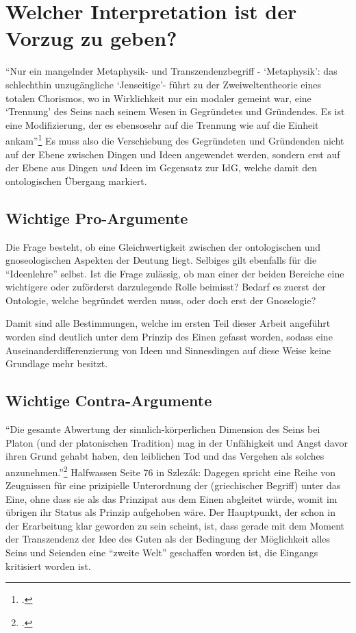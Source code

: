 \section{Welcher Interpretation ist der Vorzug zu geben?}
\enquote{Nur ein mangelnder Metaphysik- und Transzendenzbegriff - \enquote{Metaphysik}: das schlechthin unzugängliche \enquote{Jenseitige}- führt zu der Zweiweltentheorie eines totalen Chorismos, wo in Wirklichkeit nur ein modaler gemeint war, eine \enquote{Trennung} des Seins nach seinem Wesen in Gegründetes und Gründendes. Es ist eine Modifizierung, der es ebensosehr auf die Trennung wie auf die Einheit ankam}\footcite[][S. 96]{Hirschberger}
Es muss also die Verschiebung des Gegründeten und Gründenden nicht auf der Ebene zwischen Dingen und Ideen angewendet werden, sondern erst auf der Ebene aus Dingen \emph{und} Ideen im Gegensatz zur IdG, welche damit den ontologischen Übergang markiert.
\subsection{Wichtige Pro-Argumente}
Die Frage besteht, ob eine Gleichwertigkeit zwischen der ontologischen und gnoseologischen Aspekten der Deutung liegt. Selbiges gilt ebenfalls für die \enquote{Ideenlehre} selbst. Ist die Frage zulässig, ob man einer der beiden Bereiche eine wichtigere oder zuförderst darzulegende Rolle beimisst? Bedarf es zuerst der Ontologie, welche begründet werden muss, oder doch erst der Gnoselogie?

Damit sind alle Bestimmungen, welche im ersten Teil dieser Arbeit angeführt worden sind deutlich unter dem Prinzip des Einen gefasst worden, sodass eine Auseinanderdifferenzierung von Ideen und Sinnesdingen auf diese Weise keine Grundlage mehr besitzt. 
\subsection{Wichtige Contra-Argumente}
\enquote{Die gesamte Abwertung der sinnlich-körperlichen Dimension des Seins bei Platon (und der platonischen Tradition) mag in der Unfähigkeit und Angst davor ihren Grund gehabt haben, den leiblichen Tod und das Vergehen als solches anzunehmen.}\footcite[][S. 99f.]{ThurnerDualismus}
Halfwassen Seite 76 in Szlezák: Dagegen spricht eine Reihe von Zeugnissen für eine prizipielle Unterordnung der (griechischer Begriff) unter das Eine, ohne dass sie als das Prinzipat aus dem Einen abgleitet würde, womit im übrigen ihr Status als Prinzip aufgehoben wäre.
Der Hauptpunkt, der schon in der Erarbeitung klar geworden zu sein scheint, ist, dass gerade mit dem Moment der Transzendenz der Idee des Guten als der Bedingung der Möglichkeit alles Seins und Seienden eine \enquote{zweite Welt} geschaffen worden ist, die Eingangs kritisiert worden ist.

